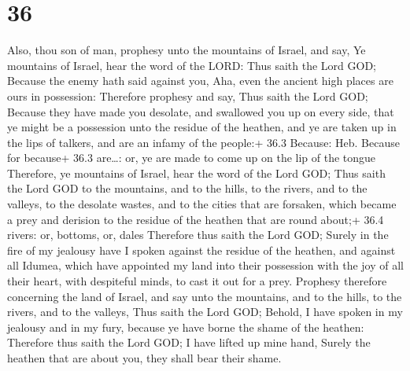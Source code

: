 \hypertarget{section-35}{%
\section{36}\label{section-35}}

 Also, thou son of man, prophesy unto the mountains of
Israel, and say, Ye mountains of Israel, hear the word of the LORD:
 Thus saith the Lord GOD; Because the enemy hath said
against you, Aha, even the ancient high places are ours in possession:
 Therefore prophesy and say, Thus saith the Lord GOD;
Because they have made you desolate, and swallowed you up on every side,
that ye might be a possession unto the residue of the heathen, and ye
are taken up in the lips of talkers, and are an infamy of the people:+
36.3 Because: Heb. Because for because+ 36.3 are\ldots: or, ye are made
to come up on the lip of the tongue  Therefore, ye mountains
of Israel, hear the word of the Lord GOD; Thus saith the Lord GOD to the
mountains, and to the hills, to the rivers, and to the valleys, to the
desolate wastes, and to the cities that are forsaken, which became a
prey and derision to the residue of the heathen that are round about;+
36.4 rivers: or, bottoms, or, dales  Therefore thus saith
the Lord GOD; Surely in the fire of my jealousy have I spoken against
the residue of the heathen, and against all Idumea, which have appointed
my land into their possession with the joy of all their heart, with
despiteful minds, to cast it out for a prey.  Prophesy
therefore concerning the land of Israel, and say unto the mountains, and
to the hills, to the rivers, and to the valleys, Thus saith the Lord
GOD; Behold, I have spoken in my jealousy and in my fury, because ye
have borne the shame of the heathen:  Therefore thus saith
the Lord GOD; I have lifted up mine hand, Surely the heathen that are
about you, they shall bear their shame.

